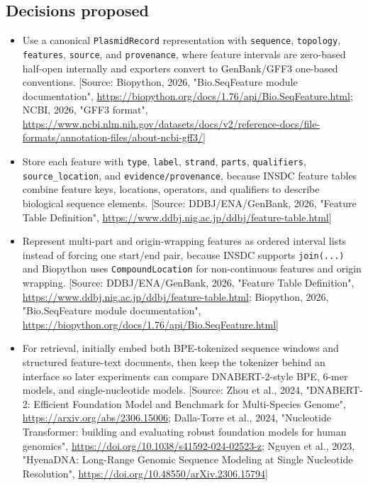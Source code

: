 \documentclass[11pt]{report}
\begin{document}
\subsection{Decisions proposed}
\begin{itemize}
\item Use a canonical \texttt{PlasmidRecord} representation with \texttt{sequence}, \texttt{topology}, \texttt{features}, \texttt{source}, and \texttt{provenance}, where feature intervals are zero-based half-open internally and exporters convert to GenBank/GFF3 one-based conventions. [Source: Biopython, 2026, "Bio.SeqFeature module documentation", \url{https://biopython.org/docs/1.76/api/Bio.SeqFeature.html}; NCBI, 2026, "GFF3 format", \url{https://www.ncbi.nlm.nih.gov/datasets/docs/v2/reference-docs/file-formats/annotation-files/about-ncbi-gff3/}]
\item Store each feature with \texttt{type}, \texttt{label}, \texttt{strand}, \texttt{parts}, \texttt{qualifiers}, \texttt{source\_location}, and \texttt{evidence/provenance}, because INSDC feature tables combine feature keys, locations, operators, and qualifiers to describe biological sequence elements. [Source: DDBJ/ENA/GenBank, 2026, "Feature Table Definition", \url{https://www.ddbj.nig.ac.jp/ddbj/feature-table.html}]
\item Represent multi-part and origin-wrapping features as ordered interval lists instead of forcing one start/end pair, because INSDC supports \texttt{join(...)} and Biopython uses \texttt{CompoundLocation} for non-continuous features and origin wrapping. [Source: DDBJ/ENA/GenBank, 2026, "Feature Table Definition", \url{https://www.ddbj.nig.ac.jp/ddbj/feature-table.html}; Biopython, 2026, "Bio.SeqFeature module documentation", \url{https://biopython.org/docs/1.76/api/Bio.SeqFeature.html}]
\item For retrieval, initially embed both BPE-tokenized sequence windows and structured feature-text documents, then keep the tokenizer behind an interface so later experiments can compare DNABERT-2-style BPE, 6-mer models, and single-nucleotide models. [Source: Zhou et al., 2024, "DNABERT-2: Efficient Foundation Model and Benchmark for Multi-Species Genome", \url{https://arxiv.org/abs/2306.15006}; Dalla-Torre et al., 2024, "Nucleotide Transformer: building and evaluating robust foundation models for human genomics", \url{https://doi.org/10.1038/s41592-024-02523-z}; Nguyen et al., 2023, "HyenaDNA: Long-Range Genomic Sequence Modeling at Single Nucleotide Resolution", \url{https://doi.org/10.48550/arXiv.2306.15794}]

\end{itemize}
\end{document}
